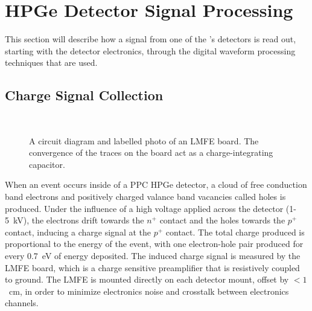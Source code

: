 \documentclass[/main.tex]{subfiles}
\begin{document}
\section{HPGe Detector Signal Processing} \label{sec:mjprocessing}
This section will describe how a signal from one of the \MJD's detectors is read out, starting with the detector electronics, through the digital waveform processing techniques that are used.

\subsection{Charge Signal Collection} \label{sec:signalelectronics}
\begin{figure}
  \centering
  ~
  \caption[LMFE circuit diagram and photo]{\label{fig:lmfe}
    A circuit diagram and labelled photo of an LMFE board. The convergence of the traces on the board act as a charge-integrating capacitor.
  }
\end{figure}
When an event occurs inside of a PPC HPGe detector, a cloud of free conduction band electrons and positively charged valance band vacancies called holes is produced.
Under the influence of a high voltage applied across the detector (1-5~kV), the electrons drift towards the $n^+$ contact and the holes towards the $p^+$ contact, inducing a charge signal at the $p^+$ contact.
The total charge produced is proportional to the energy of the event, with one electron-hole pair produced for every 0.7~eV of energy deposited.
The induced charge signal is measured by the LMFE board, which is a charge sensitive preamplifier that is resistively coupled to ground\cite{barton2012}.
The LMFE is mounted directly on each detector mount, offset by $<1$~cm, in order to minimize electronics noise and crosstalk between electronics channels.
\end{document}
